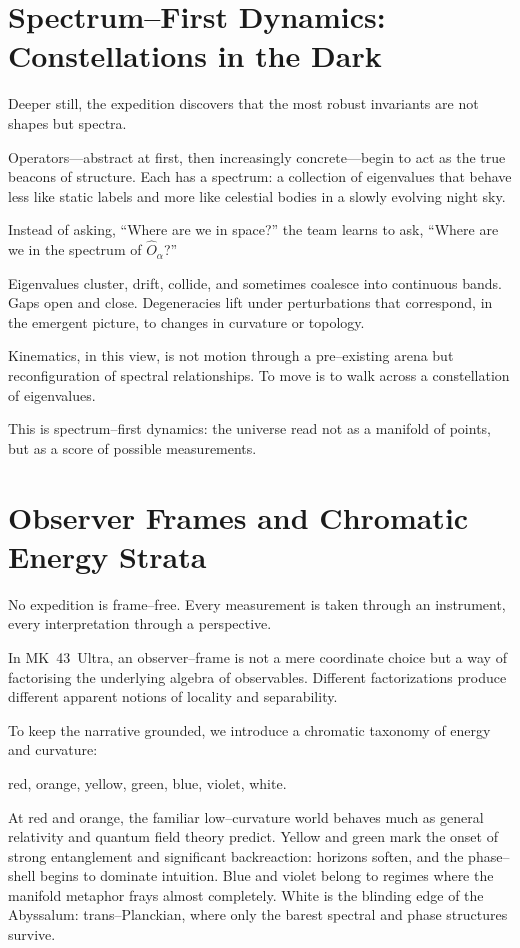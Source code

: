 \section{Spectrum–First Dynamics: Constellations in the Dark}
Deeper still, the expedition discovers that the most robust invariants are not shapes but spectra.

Operators—abstract at first, then increasingly concrete—begin to act as the true beacons of
structure. Each has a spectrum: a collection of eigenvalues that behave less like static labels
and more like celestial bodies in a slowly evolving night sky.

Instead of asking, ``Where are we in space?'' the team learns to ask,
``Where are we in the spectrum of $\hat{O}_\alpha$?''

Eigenvalues cluster, drift, collide, and sometimes coalesce into continuous bands. Gaps open and
close. Degeneracies lift under perturbations that correspond, in the emergent picture, to changes
in curvature or topology.

Kinematics, in this view, is not motion through a pre–existing arena but reconfiguration of
spectral relationships. To move is to walk across a constellation of eigenvalues.

This is spectrum–first dynamics: the universe read not as a manifold of points, but as a score of
possible measurements.

\section{Observer Frames and Chromatic Energy Strata}
No expedition is frame–free. Every measurement is taken through an instrument, every interpretation
through a perspective.

In MK~43~Ultra, an observer–frame is not a mere coordinate choice but a way of factorising the
underlying algebra of observables. Different factorizations produce different apparent notions of
locality and separability.

To keep the narrative grounded, we introduce a chromatic taxonomy of energy and curvature:
\begin{center}
  red, orange, yellow, green, blue, violet, white.
\end{center}

At red and orange, the familiar low–curvature world behaves much as general relativity and quantum
field theory predict. Yellow and green mark the onset of strong entanglement and significant
backreaction: horizons soften, and the phase–shell begins to dominate intuition. Blue and violet
belong to regimes where the manifold metaphor frays almost completely. White is the blinding edge
of the Abyssalum: trans–Planckian, where only the barest spectral and phase structures survive.

